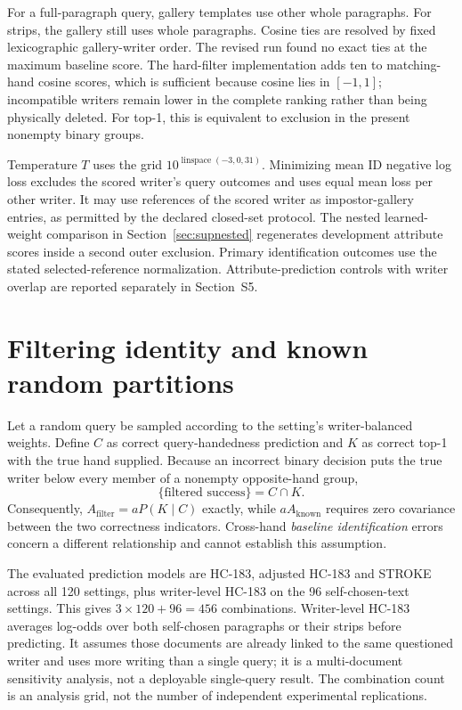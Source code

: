 \documentclass[10pt,a4paper]{article}
\begin{document}
For a full-paragraph query, gallery templates use other whole paragraphs. For strips, the gallery still uses whole paragraphs. Cosine ties are resolved by fixed lexicographic gallery-writer order. The revised run found no exact ties at the maximum baseline score. The hard-filter implementation adds ten to matching-hand cosine scores, which is sufficient because cosine lies in $[-1,1]$; incompatible writers remain lower in the complete ranking rather than being physically deleted. For top-1, this is equivalent to exclusion in the present nonempty binary groups.

Temperature $T$ uses the grid $10^{\operatorname{linspace}(-3,0,31)}$. Minimizing mean ID negative log loss excludes the scored writer's query outcomes and uses equal mean loss per other writer. It may use references of the scored writer as impostor-gallery entries, as permitted by the declared closed-set protocol. The nested learned-weight comparison in Section~\ref{sec:supnested} regenerates development attribute scores inside a second outer exclusion. Primary identification outcomes use the stated selected-reference normalization. Attribute-prediction controls with writer overlap are reported separately in Section~S5.

\section{Filtering identity and known random partitions}
Let a random query be sampled according to the setting's writer-balanced weights. Define $C$ as correct query-handedness prediction and $K$ as correct top-1 with the true hand supplied. Because an incorrect binary decision puts the true writer below every member of a nonempty opposite-hand group,
\[
\{\text{filtered success}\}=C\cap K.
\]
Consequently, $A_{\mathrm{filter}}=aP(K\mid C)$ exactly, while $aA_{\mathrm{known}}$ requires zero covariance between the two correctness indicators. Cross-hand \emph{baseline identification} errors concern a different relationship and cannot establish this assumption.

The evaluated prediction models are HC-183, adjusted HC-183 and STROKE across all 120 settings, plus writer-level HC-183 on the 96 self-chosen-text settings. This gives $3\times120+96=456$ combinations. Writer-level HC-183 averages log-odds over both self-chosen paragraphs or their strips before predicting. It assumes those documents are already linked to the same questioned writer and uses more writing than a single query; it is a multi-document sensitivity analysis, not a deployable single-query result. The combination count is an analysis grid, not the number of independent experimental replications.
\end{document}
